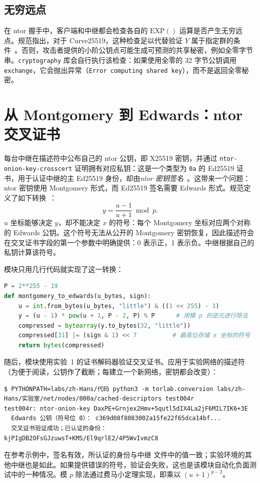 \subsection{无穷远点}

在 ntor 握手中，客户端和中继都会检查各自的 $\mathrm{EXP}()$ 运算是否产生无穷远点。规范指出，对于 Curve25519，这种检查足以代替验证 $Y$ 属于指定群的条件~。否则，攻击者提供的小阶公钥点可能生成可预测的共享秘密，例如全零字节串。\texttt{cryptography} 库会自行执行该检查：如果使用全零的 32 字节公钥调用 \texttt{exchange}，它会抛出异常（\texttt{Error computing shared key}），而不是返回全零秘密。

\section{从 Montgomery 到 Edwards：ntor 交叉证书}\label{sec:B-conversione}

每台中继在描述符中公布自己的 ntor 公钥，即 X25519 密钥，并通过 \texttt{ntor-onion-key-crosscert} 证明拥有对应私钥：这是一个类型为 \texttt{0a} 的 Ed25519 证书，用于认证中继的主 Ed25519 身份，却由\emph{ntor 密钥签名}~。这带来一个问题：ntor 密钥使用 Montgomery 形式，而 Ed25519 签名需要 Edwards 形式。规范定义了如下转换~：
\[ y = \frac{u - 1}{u + 1} \bmod p . \]
$u$ 坐标能够决定 $y$，却不能决定 $x$ 的符号：每个 Montgomery 坐标对应两个对称的 Edwards 公钥。这个符号无法从公开的 Montgomery 密钥恢复，因此描述符会在交叉证书字段的第一个参数中明确提供：0 表示正，1 表示负。中继根据自己的私钥计算该符号。

 模块只用几行代码就实现了这一转换：
\begin{lstlisting}[language=Python,numbers=none]
P = 2**255 - 19
def montgomery_to_edwards(u_bytes, sign):
    u = int.from_bytes(u_bytes, "little") & ((1 << 255) - 1)
    y = (u - 1) * pow(u + 1, P - 2, P) % P      # 用模 p 的逆元进行除法
    compressed = bytearray(y.to_bytes(32, "little"))
    compressed[31] |= (sign & 1) << 7          # 最高位存储 x 坐标的符号
    return bytes(compressed)
\end{lstlisting}
随后，模块使用实验~1 的证书解码器验证交叉证书。应用于实验网络的描述符（为便于阅读，公钥作了截断；每建立一个新网络，密钥都会改变）：
\begin{lstlisting}[numbers=none]
$ PYTHONPATH=labs/zh-Hans/代码 python3 -m torlab.conversion labs/zh-Hans/实验室/net/nodes/000a/cached-descriptors test004r
test004r: ntor-onion-key DaxPE+Grnjex2Hmv+5qutl5dIX4La2jF6MIL7IK6+3E
  Edwards 公钥（符号位 0）： c369d08f8083002a15fe22f65dca14bf...
  交叉证书验证成功；已认证的身份： kjPIgDB2OFsGJzuwsT+KMS/El9qrlE2/4P5WvIvmzC8
\end{lstlisting}
在参考示例中，签名有效，所认证的身份与中继  文件中的值一致；实验环境的其他中继也是如此。如果提供错误的符号，验证会失败，这也是该模块自动化负面测试中的一种情况。模 $p$ 除法通过费马小定理实现，即乘以 $(u+1)^{p-2}$。

